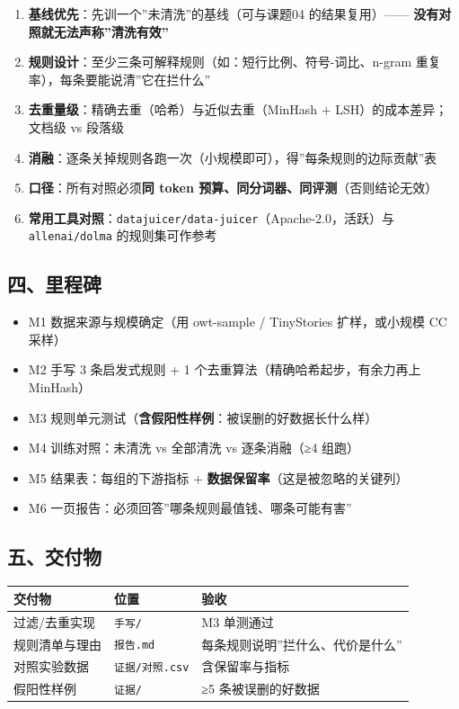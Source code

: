 \documentclass[
  chinese,
  11pt,
]{ctexart}
\newcounter{none} %
\providecommand{\tightlist}{%
  \setlength{\itemsep}{0pt}\setlength{\parskip}{0pt}}
\begin{document}
\begin{enumerate}
\def\labelenumi{\arabic{enumi}.}
\tightlist
\item
  \textbf{基线优先}：先训一个''未清洗''的基线（可与课题04 的结果复用）------ \textbf{没有对照就无法声称''清洗有效''}
\item
  \textbf{规则设计}：至少三条可解释规则（如：短行比例、符号-词比、n-gram 重复率），每条要能说清''它在拦什么''
\item
  \textbf{去重量级}：精确去重（哈希）与近似去重（MinHash + LSH）的成本差异；文档级 vs 段落级
\item
  \textbf{消融}：逐条关掉规则各跑一次（小规模即可），得''每条规则的边际贡献''表
\item
  \textbf{口径}：所有对照必须\textbf{同 token 预算、同分词器、同评测}（否则结论无效）
\item
  \textbf{常用工具对照}：\texttt{datajuicer/data-juicer}（Apache-2.0，活跃）与 \texttt{allenai/dolma} 的规则集可作参考
\end{enumerate}

\subsection{四、里程碑}\label{ux56dbux91ccux7a0bux7891}

\begin{itemize}
\tightlist
\item[$\square$]
  M1 数据来源与规模确定（用 owt-sample / TinyStories 扩样，或小规模 CC 采样）
\item[$\square$]
  M2 手写 3 条启发式规则 + 1 个去重算法（精确哈希起步，有余力再上 MinHash）
\item[$\square$]
  M3 规则单元测试（\textbf{含假阳性样例}：被误删的好数据长什么样）
\item[$\square$]
  M4 训练对照：未清洗 vs 全部清洗 vs 逐条消融（≥4 组跑）
\item[$\square$]
  M5 结果表：每组的下游指标 + \textbf{数据保留率}（这是被忽略的关键列）
\item[$\square$]
  M6 一页报告：必须回答''哪条规则最值钱、哪条可能有害''
\end{itemize}

\subsection{五、交付物}\label{ux4e94ux4ea4ux4ed8ux7269}

{\def\LTcaptype{none} %
\begin{longtable}[]{@{}lll@{}}
\toprule\noalign{}
交付物 & 位置 & 验收 \\
\midrule\noalign{}
\endhead
\bottomrule\noalign{}
\endlastfoot
过滤/去重实现 & \texttt{手写/} & M3 单测通过 \\
规则清单与理由 & \texttt{报告.md} & 每条规则说明''拦什么、代价是什么'' \\
对照实验数据 & \texttt{证据/对照.csv} & 含保留率与指标 \\
假阳性样例 & \texttt{证据/} & ≥5 条被误删的好数据 \\
\end{longtable}
}
\end{document}
